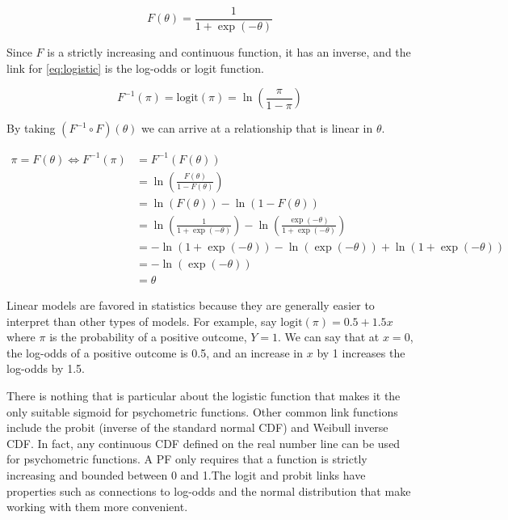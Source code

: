 \documentclass[11pt, oneside]{book}
\begin{document}
\begin{equation}
  F(\theta) = \frac{1}{1 + \exp\left(-\theta\right)}
  \label{eq:logistic}
\end{equation}

Since \(F\) is a strictly increasing and continuous function, it has an inverse, and the link for \eqref{eq:logistic} is the log-odds or logit function.

\begin{equation}
  F^{-1}(\pi) = \mathrm{logit}(\pi) = \ln\left(\frac{\pi}{1 - \pi}\right)
  \label{eq:logit}
\end{equation}

By taking \((F^{-1} \circ F)(\theta)\) we can arrive at a relationship that is linear in \(\theta\).

\begin{align*}
  \pi = F(\theta) \Longleftrightarrow F^{-1}(\pi) &= F^{-1}(F(\theta)) \\
  & = \ln\left(\frac{F(\theta)}{1 - F(\theta)}\right) \\
  &= \ln(F(\theta)) - \ln(1 - F(\theta)) \\
  &= \ln\left(\frac{1}{1 + \exp(-\theta)}\right) - \ln\left(\frac{\exp(-\theta)}{1 + \exp(-\theta)}\right) \\
  &= - \ln(1 + \exp(-\theta)) - \ln(\exp(-\theta)) + \ln(1 + \exp(-\theta)) \\
  &= - \ln(\exp(-\theta)) \\
  &= \theta
\end{align*}

Linear models are favored in statistics because they are generally easier to interpret than other types of models. For example, say \(\mathrm{logit}(\pi) = 0.5 + 1.5x\) where \(\pi\) is the probability of a positive outcome, \(Y=1\). We can say that at \(x = 0\), the log-odds of a positive outcome is 0.5, and an increase in \(x\) by 1 increases the log-odds by 1.5.

There is nothing that is particular about the logistic function that makes it the only suitable sigmoid for psychometric functions. Other common link functions include the probit (inverse of the standard normal CDF) and Weibull inverse CDF. In fact, any continuous CDF defined on the real number line can be used for psychometric functions. A PF only requires that a function is strictly increasing and bounded between 0 and 1.The logit and probit links have properties such as connections to log-odds and the normal distribution that make working with them more convenient.
\end{document}
